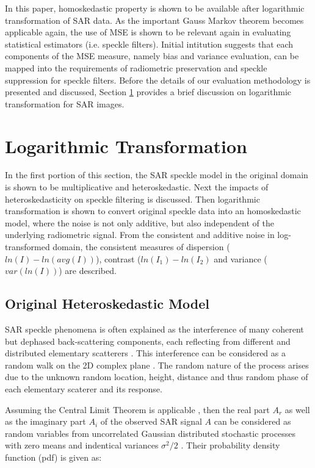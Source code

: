 \documentclass[journal]{IEEEtran}
\begin{document}
In this paper, homoskedastic property is shown to be available after logarithmic transformation of SAR data.
As the important Gauss Markov theorem becomes applicable again, 
	the use of MSE is shown to be relevant again in evaluating statistical estimators (i.e. speckle filters).
Initial intitution suggests that each components of the MSE measure, 
	namely bias and variance evaluation, can be mapped into 
	the requirements of radiometric preservation and speckle suppression for speckle filters.
Before the details of our evaluation methodology is presented and discussed, 
	Section \ref{sec:log_transform} provides a brief discussion on logarithmic transformation for SAR images.

\section{Logarithmic Transformation}
\label{sec:log_transform}

In the first portion of this section,
    the SAR speckle model in the original domain is shown to be multiplicative and heteroskedastic.
Next the impacts of heteroskedasticity on speckle filtering is discussed.
Then logarithmic transformation is shown to convert original speckle data into an homoskedastic model, where the noise is not only additive, but also independent of the underlying radiometric signal.
From the consistent and additive noise in log-transformed domain,
    the consistent measures of dispersion ($ln(I)-ln(avg(I))$), contrast ($ln(I_1)-ln(I_2)$ and variance ($var(ln(I))$) are described.

\subsection{Original Heteroskedastic Model}

SAR speckle phenomena is often explained as the interference of many coherent but dephased back-scattering components, each reflecting from different and distributed elementary scatterers \cite{Oliver_ProcIEEE_1963, Leith_ProcIEEE_1971}. This interference can be considered as a random walk on the 2D complex plane \cite{Goodman_JOptSocAm_76}.  The random nature of the process arises due to the unknown random location, height, distance and thus random phase of each elementary scaterer and its response.

Assuming the Central Limit Theorem is applicable \cite{Goodman_Springer_1975}, then the real part $A_r$ as well as the imaginary part $A_i$ of the observed SAR signal $A$ can be considered as random variables from uncorrelated Gaussian distributed stochastic processes with zero means and indentical variances $\sigma^2/2$  \cite{Lee_CRCPress_2009}. Their probability density function (pdf) is given as:
\end{document}
